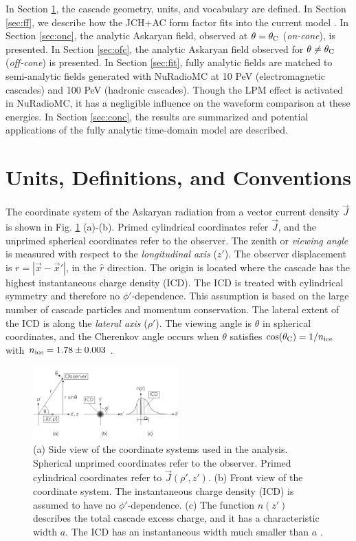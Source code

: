 \documentclass[amsmath,amssymb,aps,prd,10pt,twocolumn]{revtex4}
\begin{document}
In Section \ref{sec:unit}, the cascade geometry, units, and vocabulary are defined.  In Section \ref{sec:ff}, we describe how the JCH+AC form factor fits into the current model \cite{10.1016/j.astropartphys.2017.03.008}.  In Section \ref{sec:onc}, the analytic Askaryan field, observed at $\theta = \theta_{\rm C}$ (\textit{on-cone}), is presented.  In Section \ref{sec:ofc}, the analytic Askaryan field observed for $\theta \neq \theta_{\rm C}$ (\textit{off-cone}) is presented.  In Section \ref{sec:fit}, fully analytic fields are matched to semi-analytic fields generated with NuRadioMC \cite{10.1140/epjc/s10052-020-7612-8} at 10 PeV (electromagnetic cascades) and 100 PeV (hadronic cascades).  Though the LPM effect is activated in NuRadioMC, it has a negligible influence on the waveform comparison at these energies.  In Section \ref{sec:conc}, the results are summarized and potential applications of the fully analytic time-domain model are described.

\section{Units, Definitions, and Conventions}
\label{sec:unit}

The coordinate system of the Askaryan radiation from a vector current density $\vec{J}$ is shown in Fig. \ref{fig:geo} (a)-(b).  Primed cylindrical coordinates refer $\vec{J}$, and the unprimed spherical coordinates refer to the observer.  The zenith or \textit{viewing angle} is measured with respect to the \textit{longitudinal axis} ($z'$).  The observer displacement is $r = |\vec{x} - \vec{x}'|$, in the $\hat{r}$ direction.  The origin is located where the cascade has the highest instantaneous charge density (ICD).  The ICD is treated with cylindrical symmetry and therefore no $\phi'$-dependence.  This assumption is based on the large number of cascade particles and momentum conservation.  The lateral extent of the ICD is along the \textit{lateral axis} ($\rho'$).  The viewing angle is $\theta$ in spherical coordinates, and the Cherenkov angle occurs when $\theta$ satisfies $\cos(\theta_{\rm C}) = 1/n_{\rm ice}$ with $n_{\rm ice} = 1.78 \pm 0.003$ \cite{bog}.

\begin{figure}[ht]
\centering
\includegraphics[width=0.5\textwidth]{Geometry.pdf}
\caption{\label{fig:geo} (a) Side view of the coordinate systems used in the analysis. Spherical unprimed coordinates refer to the observer.  Primed cylindrical coordinates refer to $\vec{J}(\rho',z')$. (b) Front view of the coordinate system.  The instantaneous charge density (ICD) is assumed to have no $\phi'$-dependence. (c) The function $n(z')$ describes the total cascade excess charge, and it has a characteristic width $a$.  The ICD has an instantaneous width much smaller than $a$ \cite{10.1016/j.astropartphys.2017.03.008}.}
\end{figure}
\end{document}
